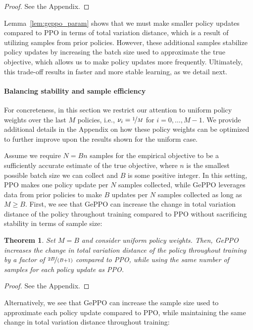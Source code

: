 \documentclass{article}
\newtheorem{theorem}{Theorem}
\begin{document}
\begin{proof}
See the Appendix.
\end{proof}

Lemma~\ref{lem:geppo_param} shows that we must make smaller policy updates compared to PPO in terms of total variation distance, which is a result of utilizing samples from prior policies. However, these additional samples stabilize policy updates by increasing the batch size used to approximate the true objective, which allows us to make policy updates more frequently. Ultimately, this trade-off results in faster and more stable learning, as we detail next.

\paragraph{Balancing stability and sample efficiency}

For concreteness, in this section we restrict our attention to uniform policy weights over the last $M$ policies, i.e., $\nu_i = \nicefrac{1}{M}$ for $i=0,\ldots,M-1$. We provide additional details in the Appendix on how these policy weights can be optimized to further improve upon the results shown for the uniform case.

Assume we require $N = Bn$ samples for the empirical objective to be a sufficiently accurate estimate of the true objective, where $n$ is the smallest possible batch size we can collect and $B$ is some positive integer. In this setting, PPO makes one policy update per $N$ samples collected, while GePPO leverages data from prior policies to make $B$ updates per $N$ samples collected as long as $M \geq B$. First, we see that GePPO can increase the change in total variation distance of the policy throughout training compared to PPO without sacrificing stability in terms of sample size:

\begin{theorem}\label{thm:geppo_tv}
Set $M = B$ and consider uniform policy weights. Then, GePPO increases the change in total variation distance of the policy throughout training by a factor of $\nicefrac{2B}{(B+1)}$ compared to PPO, while using the same number of samples for each policy update as PPO.
\end{theorem}
\begin{proof}
See the Appendix.
\end{proof}

Alternatively, we see that GePPO can increase the sample size used to approximate each policy update compared to PPO, while maintaining the same change in total variation distance throughout training:
\end{document}
